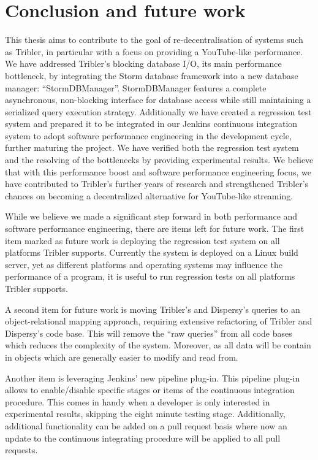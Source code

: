 \chapter{Conclusion and future work}
\label{cpt:conclusion_and_future_work}

This thesis aims to contribute to the goal of re-decentralisation of systems such as Tribler, in particular with a focus on providing a YouTube-like performance.
We have addressed Tribler's blocking database I/O, its main performance bottleneck, by integrating the Storm database framework into a new database manager: \enquote{StormDBManager}.
StormDBManager features a complete asynchronous, non-blocking interface for database access while still maintaining a serialized query execution strategy.
Additionally we have created a regression test system and prepared it to be integrated in our Jenkins continuous integration system to adopt software performance engineering in the development cycle, further maturing the project.
We have verified both the regression test system and the resolving of the bottlenecks by providing experimental results.
We believe that with this performance boost and software performance engineering focus, we have contributed to Tribler's further years of research and strengthened Tribler's chances on becoming a decentralized alternative for YouTube-like streaming.

While we believe we made a significant step forward in both performance and software performance engineering, there are items left for future work.
The first item marked as future work is deploying the regression test system on all platforms Tribler supports.
Currently the system is deployed on a Linux build server, yet as different platforms and operating systems may influence the performance of a program, it is useful to run regression tests on all platforms Tribler supports.

A second item for future work is moving Tribler's and Dispersy's queries to an object-relational mapping approach, requiring extensive refactoring of Tribler and Dispersy's code base.
This will remove the \enquote{raw queries} from all code bases which reduces the complexity of the system.
Moreover, as all data will be contain in objects which are generally easier to modify and read from.

Another item is leveraging Jenkins' new pipeline plug-in.
This pipeline plug-in allows to enable/disable specific stages or items of the continuous integration procedure.
This comes in handy when a developer is only interested in experimental results, skipping the eight minute testing stage.
Additionally, additional functionality can be added on a pull request basis where now an update to the continuous integrating procedure will be applied to all pull requests.

